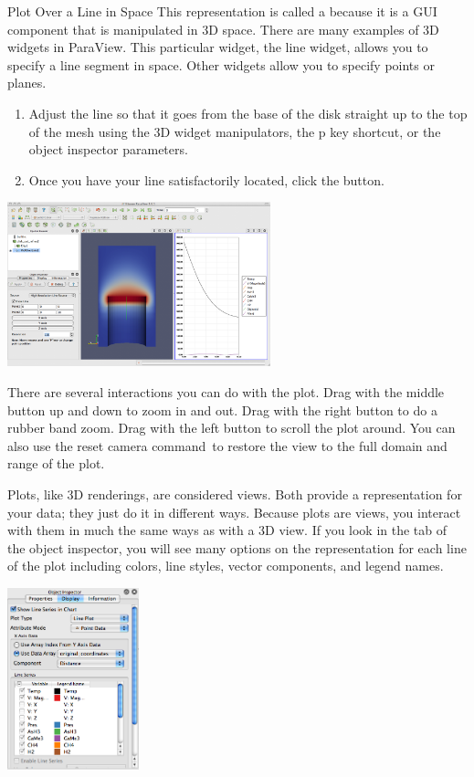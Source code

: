 \begin{exercise}{Plot Over a Line in Space}
  This representation is called a  because it is a GUI
  component that is manipulated in 3D space.  There are many examples of 3D
  widgets in ParaView.  This particular widget, the line widget, allows you
  to specify a line segment in space.  Other widgets allow you to specify
  points or planes.

  \begin{enumerate}
    \restorecounter
  \item Adjust the line so that it goes from the base of the disk straight up
    to the top of the mesh using the 3D widget manipulators, the p key
    shortcut, or the object inspector parameters.
  \item Once you have your line satisfactorily located, click the \apply
    button.
  \end{enumerate}

  \begin{inlinefig}
    \includegraphics[width=3in]{images/LinePlot2}
  \end{inlinefig}

  There are several interactions you can do with the plot.  Drag with the
  middle button up and down to zoom in and out.  Drag with the right button
  to do a rubber band zoom.  Drag with the left button to scroll the plot
  around.  You can also use the reset camera command~\resetCamera to restore
  the view to the full domain and range of the plot.
\end{exercise}

Plots, like 3D renderings, are considered views.  Both provide a
representation for your data; they just do it in different ways.  Because
plots are views, you interact with them in much the same ways as with a 3D
view.  If you look in the  tab of the object inspector, you
will see many options on the representation for each line of the plot
including colors, line styles, vector components, and legend names.
\begin{inlinefig}
  \includegraphics[width=1.5in]{images/PlotDisplayTab}
\end{inlinefig}

